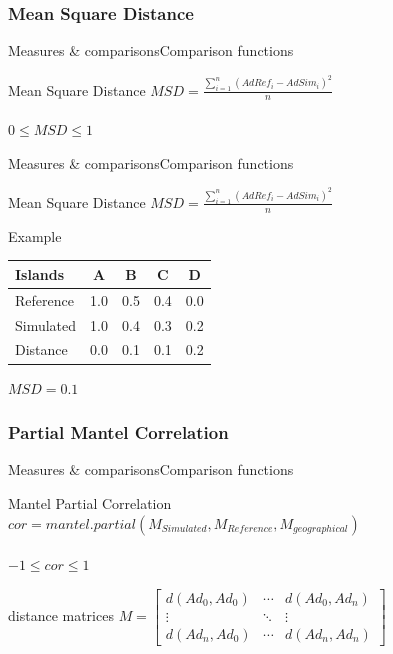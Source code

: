 \documentclass[10pt,aspectratio=43]{beamer}
\begin{document}
\subsubsection{Mean Square Distance}
\begin{frame}{Measures \& comparisons}{Comparison functions}
\begin{mblock}{0.7}{Mean Square Distance}
  \centering  
  $MSD = \frac{\sum\limits_{i=1}^{n} (AdRef_i - AdSim_i) ^ 2}{n}$\\~\\
  $0 \le MSD \le 1$
\end{mblock}
\end{frame}

\addtocounter{framenumber}{-1}
\begin{frame}{Measures \& comparisons}{Comparison functions}
\begin{mblock}{0.7}{Mean Square Distance}
  \centering  
  $MSD = \frac{\sum\limits_{i=1}^{n} (AdRef_i - AdSim_i) ^ 2}{n}$
\end{mblock}
\begin{mblock}{0.7}{Example}
  \begin{center}
    \begin{tabular}{l | c | c | c | c }
      Islands & A & B & C & D \\
      \hline \hline
      Reference & 1.0 & 0.5 & 0.4 & 0.0 \\
      Simulated & 1.0 & 0.4 & 0.3 & 0.2 \\
      \hline
      Distance & 0.0 & 0.1 & 0.1 & 0.2
    \end{tabular}
  \end{center}
  \centering
  $MSD = 0.1$
\end{mblock}
\end{frame}

\subsubsection{Partial Mantel Correlation}
\begin{frame}{Measures \& comparisons}{Comparison functions}
\begin{mblock}{0.7}{Mantel Partial Correlation}
  \centering  
  $cor = mantel.partial(M_{Simulated}, M_{Reference}, M_{geographical})$\\~\\
  $-1 \le cor \le 1$
\end{mblock}
\begin{mblock}{0.7}{distance matrices}
  \centering  
  $M = \begin{bmatrix}
		d(Ad_0, Ad_0)	& \cdots & d(Ad_0, Ad_n) \\
		\vdots			& \ddots & \vdots		 \\
		d(Ad_n, Ad_0)	& \cdots & d(Ad_n, Ad_n)
	\end{bmatrix}$
\end{mblock}
\end{frame}
\end{document}
